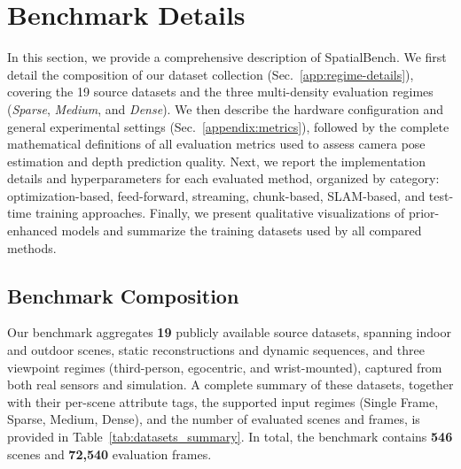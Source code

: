 \documentclass{llmxive}
\providecommand{\benchmark}{SpatialBench\xspace}
\begin{document}
\section{Benchmark Details}
\label{appendix:benchmarkdetails}

In this section, we provide a comprehensive description of \benchmark.
%
We first detail the composition of our dataset collection (Sec.~\ref{app:regime-details}), covering the 19 source datasets and the three multi-density evaluation regimes (\textit{Sparse}, \textit{Medium}, and \textit{Dense}).
%
We then describe the hardware configuration and general experimental settings (Sec.~\ref{appendix:metrics}), followed by the complete mathematical definitions of all evaluation metrics used to assess camera pose estimation and depth prediction quality.
%
Next, we report the implementation details and hyperparameters for each evaluated method, organized by category: optimization-based, feed-forward, streaming, chunk-based, SLAM-based, and test-time training approaches.
%
Finally, we present qualitative visualizations of prior-enhanced models and summarize the training datasets used by all compared methods.

\subsection{Benchmark Composition}
\label{appendix:full_benchmark}

Our benchmark aggregates \textbf{19} publicly available source datasets, spanning indoor and outdoor scenes, static reconstructions and dynamic sequences, and three viewpoint regimes (third-person, egocentric, and wrist-mounted), captured from both real sensors and simulation.
%
A complete summary of these datasets, together with their per-scene attribute tags, the supported input regimes (Single Frame, Sparse, Medium, Dense), and the number of evaluated scenes and frames, is provided in Table~\ref{tab:datasets_summary}.
%
In total, the benchmark contains \textbf{546} scenes and
\textbf{72{,}540} evaluation frames.
\end{document}
